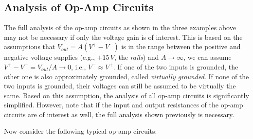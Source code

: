 \documentclass{article}
\begin{document}
\subsection*{Analysis of Op-Amp Circuits}


The full analysis of the op-amp circuits as shown in the three examples
above may not be necessary if only the voltage gain is of interest. This 
is based on the assumptions that $V_{out}=A(V^+-V^-)$ is in the range 
between the positive and negative voltage supplies (e.g., $\pm 15\,V$, 
the {\em rails}) and $A\rightarrow\infty$, we can assume 
$V^+-V^-=V_{out}/A\rightarrow 0$, i.e., $V^-\approx V^+$. If one of the 
two inputs is grounded, the other one is also approximately grounded,
called {\em virtually grounded}. If none of the two inputs is grounded, 
their voltages can still be assumed to be virtually the same. Based on 
this assumption, the analysis of all op-amp circuits is significantly
simplified. However, note that if the input and output resistances of 
the op-amp circuits are of interest as well, the full analysis shown 
previously is necessary.

Now consider the following typical op-amp circuits:
\end{document}

